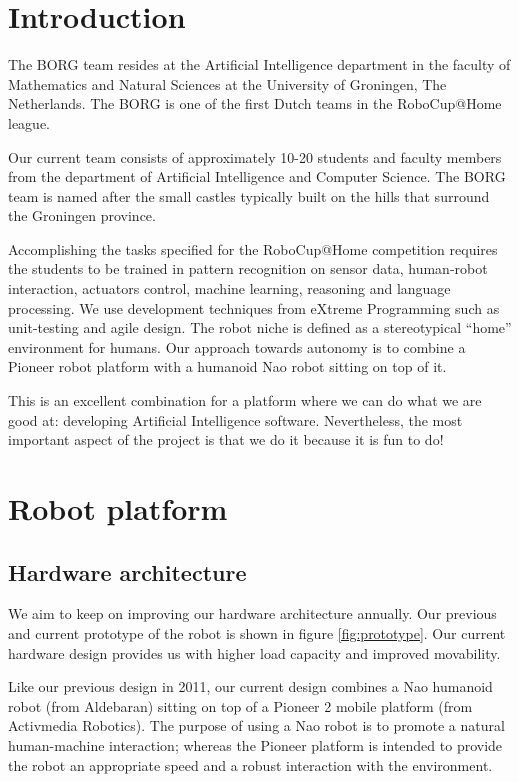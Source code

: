 \documentclass[runningheads,a4paper]{llncs}
\begin{document}
\section{Introduction}

The BORG team resides at the Artificial Intelligence department in the faculty of Mathematics and Natural Sciences at the University of Groningen, The Netherlands. 
The BORG is one of the first Dutch teams in the RoboCup@Home league.

Our current team consists of approximately 10-20 students and faculty members from the department of Artificial Intelligence and Computer Science. 
The BORG team is named after the small castles typically built on the hills that surround the Groningen province.

Accomplishing the tasks specified for the RoboCup@Home competition requires the students to be trained in pattern recognition on sensor data, human-robot interaction, actuators control, machine learning, reasoning and language processing. 
We use development techniques from eXtreme Programming such as unit-testing and agile design. 
The robot niche is defined as a stereotypical ``home'' environment for humans. 
Our approach towards autonomy is to combine a Pioneer robot platform with a humanoid Nao robot sitting on top of it.

This is an excellent combination for a platform where we can do what we are good at: developing Artificial Intelligence software. 
Nevertheless, the most important aspect of the project is that we do it because it is fun to do!

\section{Robot platform}
\subsection{Hardware architecture}

We aim to keep on improving our hardware architecture annually.
Our previous and current prototype of the robot is shown in figure \ref{fig:prototype}.
Our current hardware design provides us with higher load capacity and improved movability.

Like our previous design in 2011, our current design combines a Nao humanoid robot (from Aldebaran) sitting on top of a Pioneer 2 mobile platform (from Activmedia Robotics).
The purpose of using a Nao robot is to promote a natural human-machine interaction; whereas the Pioneer platform is intended to provide the robot an appropriate speed and a robust interaction with the environment.
\end{document}

